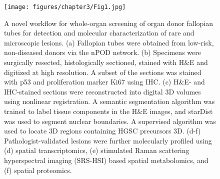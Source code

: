 \begin{refsection}
    \begin{figure}[h!]
        \begin{center}
            \texttt{[image: figures/chapter3/Fig1.jpg]}
            \caption{A novel workflow for whole-organ screening of organ donor fallopian tubes for detection and molecular characterization of rare and microscopic lesions. (a) Fallopian tubes were obtained from low-risk, non-diseased donors via the nPOD network. (b) Specimens were surgically resected, histologically sectioned, stained with H\&E and digitized at high resolution. A subset of the sections was stained with p53 and proliferation marker Ki67 using IHC. (c) H\&E- and IHC-stained sections were reconstructed into digital 3D volumes using nonlinear registration. A semantic segmentation algorithm was trained to label tissue components in the H\&E images, and starDist was used to segment nuclear boundaries. A supervised algorithm was used to locate 3D regions containing HGSC precursors 3D. (d-f) Pathologist-validated lesions were further molecularly profiled using (d) spatial transcriptomics, (e) stimulated Raman scattering hyperspectral imaging (SRS-HSI) based spatial metabolomics, and (f) spatial proteomics.}
            \label{chapter3_fig1}
        \end{center}
    \end{figure}
    

\end{refsection}
